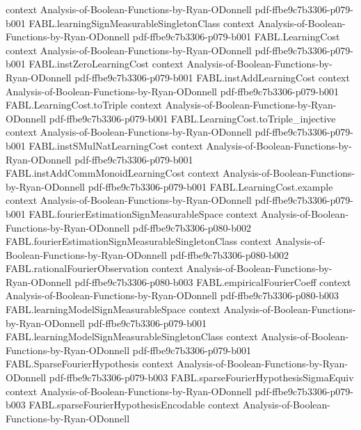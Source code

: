 \begin{theorem}
  {context}
  {Analysis-of-Boolean-Functions-by-Ryan-ODonnell}
  {pdf-ffbe9c7b3306-p079-b001}
\proofstep
  {FABL.learningSignMeasurableSingletonClass}
  {context}
  {Analysis-of-Boolean-Functions-by-Ryan-ODonnell}
  {pdf-ffbe9c7b3306-p079-b001}
\proofstep
  {FABL.LearningCost}
  {context}
  {Analysis-of-Boolean-Functions-by-Ryan-ODonnell}
  {pdf-ffbe9c7b3306-p079-b001}
\proofstep
  {FABL.instZeroLearningCost}
  {context}
  {Analysis-of-Boolean-Functions-by-Ryan-ODonnell}
  {pdf-ffbe9c7b3306-p079-b001}
\proofstep
  {FABL.instAddLearningCost}
  {context}
  {Analysis-of-Boolean-Functions-by-Ryan-ODonnell}
  {pdf-ffbe9c7b3306-p079-b001}
\proofstep
  {FABL.LearningCost.toTriple}
  {context}
  {Analysis-of-Boolean-Functions-by-Ryan-ODonnell}
  {pdf-ffbe9c7b3306-p079-b001}
\proofstep
  {FABL.LearningCost.toTriple_injective}
  {context}
  {Analysis-of-Boolean-Functions-by-Ryan-ODonnell}
  {pdf-ffbe9c7b3306-p079-b001}
\proofstep
  {FABL.instSMulNatLearningCost}
  {context}
  {Analysis-of-Boolean-Functions-by-Ryan-ODonnell}
  {pdf-ffbe9c7b3306-p079-b001}
\proofstep
  {FABL.instAddCommMonoidLearningCost}
  {context}
  {Analysis-of-Boolean-Functions-by-Ryan-ODonnell}
  {pdf-ffbe9c7b3306-p079-b001}
\proofstep
  {FABL.LearningCost.example}
  {context}
  {Analysis-of-Boolean-Functions-by-Ryan-ODonnell}
  {pdf-ffbe9c7b3306-p079-b001}
\proofstep
  {FABL.fourierEstimationSignMeasurableSpace}
  {context}
  {Analysis-of-Boolean-Functions-by-Ryan-ODonnell}
  {pdf-ffbe9c7b3306-p080-b002}
\proofstep
  {FABL.fourierEstimationSignMeasurableSingletonClass}
  {context}
  {Analysis-of-Boolean-Functions-by-Ryan-ODonnell}
  {pdf-ffbe9c7b3306-p080-b002}
\proofstep
  {FABL.rationalFourierObservation}
  {context}
  {Analysis-of-Boolean-Functions-by-Ryan-ODonnell}
  {pdf-ffbe9c7b3306-p080-b003}
\proofstep
  {FABL.empiricalFourierCoeff}
  {context}
  {Analysis-of-Boolean-Functions-by-Ryan-ODonnell}
  {pdf-ffbe9c7b3306-p080-b003}
\proofstep
  {FABL.learningModelSignMeasurableSpace}
  {context}
  {Analysis-of-Boolean-Functions-by-Ryan-ODonnell}
  {pdf-ffbe9c7b3306-p079-b001}
\proofstep
  {FABL.learningModelSignMeasurableSingletonClass}
  {context}
  {Analysis-of-Boolean-Functions-by-Ryan-ODonnell}
  {pdf-ffbe9c7b3306-p079-b001}
\proofstep
  {FABL.SparseFourierHypothesis}
  {context}
  {Analysis-of-Boolean-Functions-by-Ryan-ODonnell}
  {pdf-ffbe9c7b3306-p079-b003}
\proofstep
  {FABL.sparseFourierHypothesisSigmaEquiv}
  {context}
  {Analysis-of-Boolean-Functions-by-Ryan-ODonnell}
  {pdf-ffbe9c7b3306-p079-b003}
\proofstep
  {FABL.sparseFourierHypothesisEncodable}
  {context}
  {Analysis-of-Boolean-Functions-by-Ryan-ODonnell}

\end{theorem}
